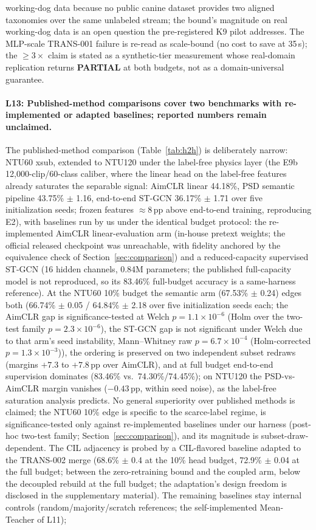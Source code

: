 working-dog data because no public canine dataset provides two aligned taxonomies over the same unlabeled stream; the bound's magnitude on real working-dog data is an open question the pre-registered K9 pilot addresses. The MLP-scale TRANS-001 failure is re-read as scale-bound (no cost to save at 35\,s); the $\geq 3\times$ claim is stated as a synthetic-tier measurement whose real-domain replication returns \textbf{PARTIAL} at both budgets, not as a domain-universal guarantee.

\paragraph{L13: Published-method comparisons cover two benchmarks with re-implemented or adapted baselines; reported numbers remain unclaimed.}
The published-method comparison (Table~\ref{tab:h2h}) is deliberately narrow: NTU60 xsub, extended to NTU120 under the label-free physics layer (the E9b 12,000-clip/60-class caliber, where the linear head on the label-free features already saturates the separable signal: AimCLR linear 44.18\%, PSD semantic pipeline 43.75\% $\pm$ 1.16, end-to-end ST-GCN 36.17\% $\pm$ 1.71 over five initialization seeds; frozen features ${\approx}8$\,pp above end-to-end training, reproducing E2), with baselines run by us under the identical budget protocol: the re-implemented AimCLR linear-evaluation arm (in-house pretext weights; the official released checkpoint was unreachable, with fidelity anchored by the equivalence check of Section~\ref{sec:comparison}) and a reduced-capacity supervised ST-GCN (16 hidden channels, 0.84M parameters; the published full-capacity model is not reproduced, so its 83.46\% full-budget accuracy is a same-harness reference). At the NTU60 10\% budget the semantic arm (67.53\% $\pm$ 0.24) edges both (66.74\% $\pm$ 0.05 / 64.84\% $\pm$ 2.18 over five initialization seeds each; the AimCLR gap is significance-tested at Welch $p{=}1.1\times10^{-6}$ (Holm over the two-test family $p{=}2.3\times10^{-6}$), the ST-GCN gap is not significant under Welch due to that arm's seed instability, Mann--Whitney raw $p{=}6.7\times10^{-4}$ (Holm-corrected $p{=}1.3\times10^{-3}$)), the ordering is preserved on two independent subset redraws (margins $+7.3$ to $+7.8$\,pp over AimCLR), and at full budget end-to-end supervision dominates (83.46\% vs.\ 74.30\%/74.45\%); on NTU120 the PSD-vs-AimCLR margin vanishes ($-0.43$\,pp, within seed noise), as the label-free saturation analysis predicts. No general superiority over published methods is claimed; the NTU60 10\% edge is specific to the scarce-label regime, is significance-tested only against re-implemented baselines under our harness (post-hoc two-test family; Section~\ref{sec:comparison}), and its magnitude is subset-draw-dependent. The CIL adjacency is probed by a CIL-flavored baseline adapted to the TRANS-002 merge (68.6\% $\pm$ 0.4 at the 10\% head budget, 72.9\% $\pm$ 0.04 at the full budget; between the zero-retraining bound and the coupled arm, below the decoupled rebuild at the full budget; the adaptation's design freedom is disclosed in the supplementary material). The remaining baselines stay internal controls (random/majority/scratch references; the self-implemented Mean-Teacher of L11); 